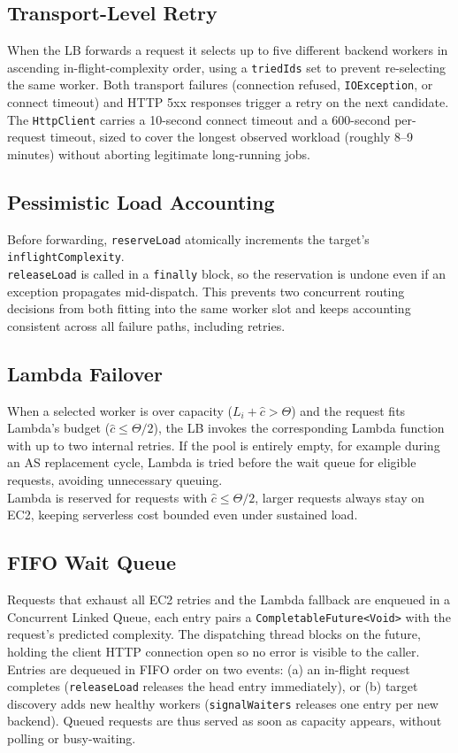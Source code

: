 \documentclass[10pt]{article}
\begin{document}
\subsection{Transport-Level Retry}\label{sec:ft:retry}
When the LB forwards a request it selects up to five different backend workers
in ascending in-flight-complexity order, using a \texttt{triedIds} set to
prevent re-selecting the same worker. Both transport failures (connection
refused, \texttt{IOException}, or connect timeout) and HTTP 5xx responses
trigger a retry on the next candidate. The \texttt{HttpClient} carries a
10-second connect timeout and a 600-second per-request timeout, sized to cover
the longest observed workload (roughly 8--9 minutes) without aborting
legitimate long-running jobs.

\subsection{Pessimistic Load Accounting}\label{sec:ft:accounting}
Before forwarding, \texttt{reserveLoad} atomically increments the target's
\texttt{inflightComplexity}.\\ \texttt{releaseLoad} is called in a
\texttt{finally} block, so the reservation is undone even if an exception
propagates mid-dispatch. This prevents two concurrent routing decisions from
both fitting into the same worker slot and keeps accounting consistent across
all failure paths, including retries.

\subsection{Lambda Failover}\label{sec:ft:lambda}
When a selected worker is over capacity ($L_i + \hat{c} > \Theta$) and the
request fits Lambda's budget ($\hat{c} \leq \Theta/2$), the LB invokes the
corresponding Lambda function with up to two internal retries. If the pool is
entirely empty, for example during an AS replacement cycle, Lambda is
tried before the wait queue for eligible requests, avoiding unnecessary queuing.\\
Lambda is reserved for requests with $\hat{c} \leq \Theta/2$, larger requests
always stay on EC2, keeping serverless cost bounded even under sustained load.

\subsection{FIFO Wait Queue}\label{sec:ft:queue}
Requests that exhaust all EC2 retries and the Lambda fallback are enqueued in
a Concurrent Linked Queue, each entry pairs a
\texttt{CompletableFuture<Void>} with the request's predicted complexity. The
dispatching thread blocks on the future, holding the client HTTP connection
open so no error is visible to the caller. \\ Entries are dequeued in FIFO order
on two events: (a) an in-flight request completes (\texttt{releaseLoad}
releases the head entry immediately), or (b) target discovery adds new healthy
workers (\texttt{signalWaiters} releases one entry per new backend). Queued
requests are thus served as soon as capacity appears, without polling or
busy-waiting.
\end{document}
